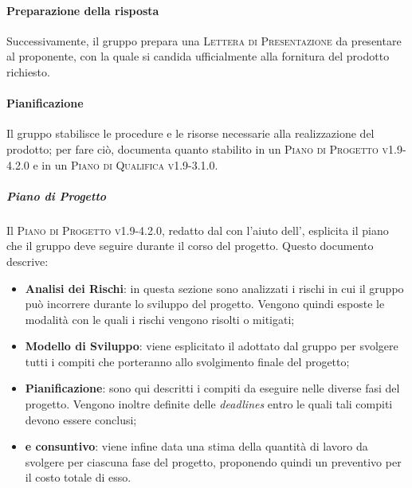\documentclass[../norme-di-progetto.tex]{subfiles}
\begin{document}
\paragraph{Preparazione della risposta}
Successivamente, il gruppo prepara una \textsc{Lettera di Presentazione} da presentare al proponente, con la quale si candida ufficialmente alla fornitura del prodotto richiesto.

\paragraph{Pianificazione}
Il gruppo stabilisce le procedure e le risorse necessarie alla realizzazione del prodotto; per fare ciò, documenta quanto stabilito in un \textsc{Piano di Progetto v1.9-4.2.0} e in un \textsc{Piano di Qualifica v1.9-3.1.0}.

\subparagraph*{Piano di Progetto}
Il \textsc{Piano di Progetto v1.9-4.2.0}, redatto dal  con l'aiuto dell', esplicita il piano che il gruppo deve seguire durante il corso del progetto. Questo documento descrive:
\begin{itemize}
  \item \textbf{Analisi dei Rischi}: in questa sezione sono analizzati i rischi in cui il gruppo può incorrere durante lo sviluppo del progetto. Vengono quindi esposte le modalità con le quali i rischi vengono risolti o mitigati;
  \item \textbf{Modello di Sviluppo}: viene esplicitato il  adottato dal gruppo per svolgere tutti i compiti che porteranno allo svolgimento finale del progetto;
  \item \textbf{Pianificazione}: sono qui descritti i compiti da eseguire nelle diverse fasi del progetto. Vengono inoltre definite delle \textit{deadlines} entro le quali tali compiti devono essere conclusi;
  \item \textbf{ e consuntivo}: viene infine data una stima della quantità di lavoro da svolgere per ciascuna fase del progetto, proponendo quindi un preventivo per il costo totale di esso.
\end{itemize}
\end{document}
